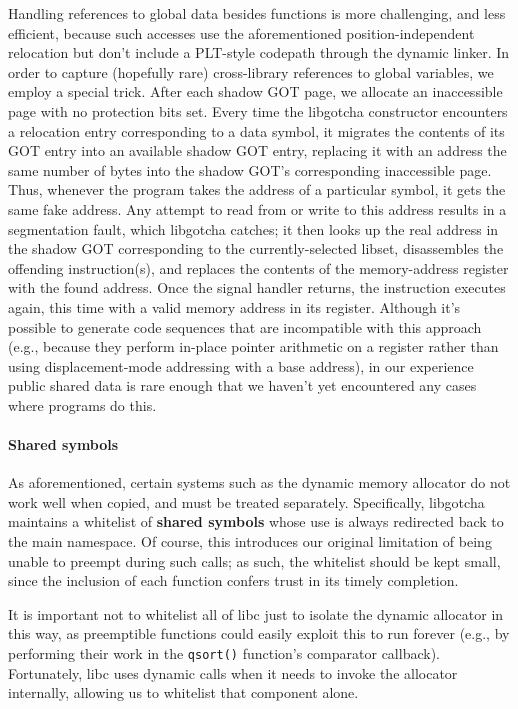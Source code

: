 Handling references to global data besides functions is more challenging, and less
efficient, because such accesses use the aforementioned position-independent
relocation but don't include a PLT-style codepath through the dynamic linker.
In order to capture (hopefully rare) cross-library references to global variables,
we employ a special trick.  After each shadow GOT page, we allocate an inaccessible
page with no protection bits set.  Every time the libgotcha constructor encounters a
relocation entry corresponding to a data symbol, it migrates the contents of its GOT
entry into an available shadow GOT entry, replacing it with an address the same
number of bytes into the shadow GOT's corresponding inaccessible page.  Thus,
whenever the program takes the address of a particular symbol, it gets the same fake
address.  Any attempt to read from or write to this address results in a segmentation
fault, which libgotcha catches; it then looks up the real address in the shadow GOT
corresponding to the currently-selected libset, disassembles the offending
instruction(s), and replaces the contents of the memory-address register with the
found address.  Once the signal handler returns, the instruction executes again, this
time with a valid memory address in its register.  Although it's possible to generate
code sequences that are incompatible with this approach (e.g., because they perform
in-place pointer arithmetic on a register rather than using displacement-mode
addressing with a base address), in our experience public shared data is rare enough
that we haven't yet encountered any cases where programs do this.

\paragraph{Shared symbols}


As aforementioned, certain systems such as the dynamic memory allocator do not work
well when copied, and must be treated separately.  Specifically, libgotcha maintains
a whitelist of \textbf{shared symbols} whose use is always redirected back to the
main namespace.  Of course, this introduces our original limitation of being unable
to preempt during such calls; as such, the whitelist should be kept small, since the
inclusion of each function confers trust in its timely completion.

It is important not to whitelist all of libc just to isolate the dynamic allocator in
this way, as preemptible functions could easily exploit this to run forever (e.g., by
performing their work in the \texttt{qsort()} function's comparator callback).
Fortunately, libc uses dynamic calls when it needs to invoke the allocator
internally, allowing us to whitelist that component alone.

